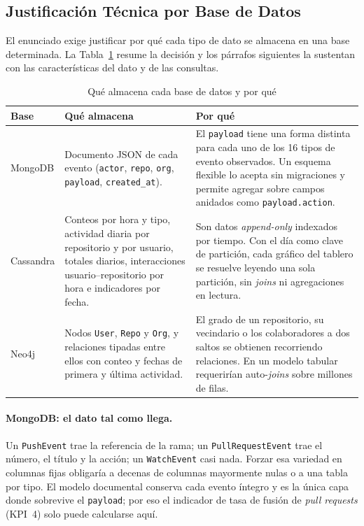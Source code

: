 \subsection{Justificación Técnica por Base de Datos}
\label{subsec:justificacion}

El enunciado exige justificar por qué cada tipo de dato se almacena en una base determinada. La Tabla~\ref{tab:justificacion} resume la decisión y los párrafos siguientes la sustentan con las características del dato y de las consultas.

\begin{table}[H]
\centering
\caption{Qué almacena cada base de datos y por qué}
\label{tab:justificacion}
\vspace{0.2cm}
\small
\begin{tabular}{@{}p{2.1cm}p{4.3cm}p{8.3cm}@{}}
\toprule
\textbf{Base} & \textbf{Qué almacena} & \textbf{Por qué} \\
\midrule
MongoDB &
Documento JSON de cada evento (\texttt{actor}, \texttt{repo}, \texttt{org}, \texttt{payload}, \texttt{created\_at}). &
El \texttt{payload} tiene una forma distinta para cada uno de los 16 tipos de evento observados. Un esquema flexible lo acepta sin migraciones y permite agregar sobre campos anidados como \texttt{payload.action}. \\
\addlinespace
Cassandra &
Conteos por hora y tipo, actividad diaria por repositorio y por usuario, totales diarios, interacciones usuario--repositorio por hora e indicadores por fecha. &
Son datos \textit{append-only} indexados por tiempo. Con el día como clave de partición, cada gráfico del tablero se resuelve leyendo una sola partición, sin \textit{joins} ni agregaciones en lectura. \\
\addlinespace
Neo4j &
Nodos \texttt{User}, \texttt{Repo} y \texttt{Org}, y relaciones tipadas entre ellos con conteo y fechas de primera y última actividad. &
El grado de un repositorio, su vecindario o los colaboradores a dos saltos se obtienen recorriendo relaciones. En un modelo tabular requerirían auto-\textit{joins} sobre millones de filas. \\
\bottomrule
\end{tabular}
\end{table}

\paragraph{MongoDB: el dato tal como llega.} Un \texttt{PushEvent} trae la referencia de la rama; un \texttt{PullRequestEvent} trae el número, el título y la acción; un \texttt{WatchEvent} casi nada. Forzar esa variedad en columnas fijas obligaría a decenas de columnas mayormente nulas o a una tabla por tipo. El modelo documental conserva cada evento íntegro y es la única capa donde sobrevive el \texttt{payload}; por eso el indicador de tasa de fusión de \textit{pull requests} (KPI~4) solo puede calcularse aquí.

